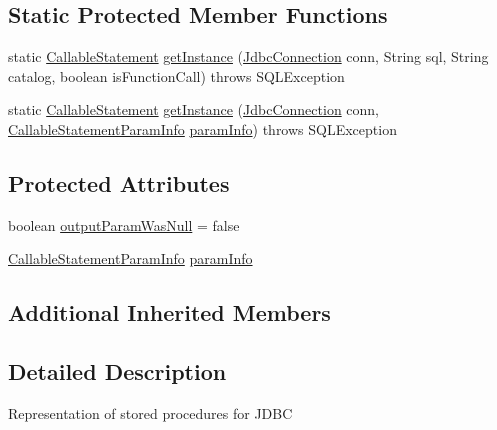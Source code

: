 \subsection*{Static Protected Member Functions}
\begin{DoxyCompactItemize}
\item 
static \mbox{\hyperlink{classcom_1_1mysql_1_1cj_1_1jdbc_1_1_callable_statement}{Callable\+Statement}} \mbox{\hyperlink{classcom_1_1mysql_1_1cj_1_1jdbc_1_1_callable_statement_a1226691f1ed6861ed209ec30c4cabb6d}{get\+Instance}} (\mbox{\hyperlink{interfacecom_1_1mysql_1_1cj_1_1jdbc_1_1_jdbc_connection}{Jdbc\+Connection}} conn, String sql, String catalog, boolean is\+Function\+Call)  throws S\+Q\+L\+Exception 
\item 
static \mbox{\hyperlink{classcom_1_1mysql_1_1cj_1_1jdbc_1_1_callable_statement}{Callable\+Statement}} \mbox{\hyperlink{classcom_1_1mysql_1_1cj_1_1jdbc_1_1_callable_statement_a0b4b36b3823d177a749e09a4a32971a9}{get\+Instance}} (\mbox{\hyperlink{interfacecom_1_1mysql_1_1cj_1_1jdbc_1_1_jdbc_connection}{Jdbc\+Connection}} conn, \mbox{\hyperlink{classcom_1_1mysql_1_1cj_1_1jdbc_1_1_callable_statement_1_1_callable_statement_param_info}{Callable\+Statement\+Param\+Info}} \mbox{\hyperlink{classcom_1_1mysql_1_1cj_1_1jdbc_1_1_callable_statement_a9b918f6fd2f0ff28fc6b3c8560d9a59b}{param\+Info}})  throws S\+Q\+L\+Exception 
\end{DoxyCompactItemize}
\subsection*{Protected Attributes}
\begin{DoxyCompactItemize}
\item 
boolean \mbox{\hyperlink{classcom_1_1mysql_1_1cj_1_1jdbc_1_1_callable_statement_a50b0a5e60e29ab7d67b07a27004293c4}{output\+Param\+Was\+Null}} = false
\item 
\mbox{\hyperlink{classcom_1_1mysql_1_1cj_1_1jdbc_1_1_callable_statement_1_1_callable_statement_param_info}{Callable\+Statement\+Param\+Info}} \mbox{\hyperlink{classcom_1_1mysql_1_1cj_1_1jdbc_1_1_callable_statement_a9b918f6fd2f0ff28fc6b3c8560d9a59b}{param\+Info}}
\end{DoxyCompactItemize}
\subsection*{Additional Inherited Members}


\subsection{Detailed Description}
Representation of stored procedures for J\+D\+BC 

